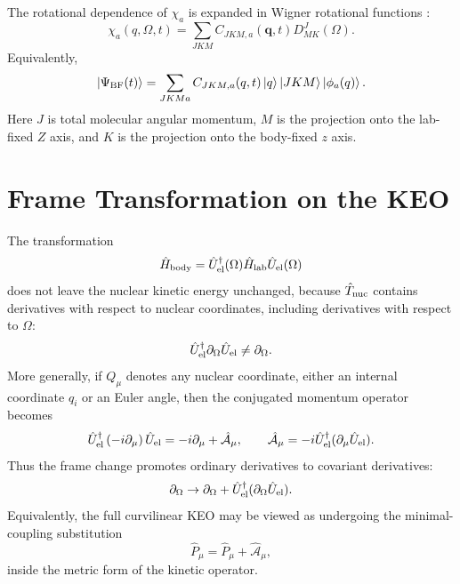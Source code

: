 \documentclass[11pt]{revtex4-2}
\begin{document}
The rotational dependence of $\chi_a$ is expanded in Wigner rotational
functions \cite{zare1988,varshalovich1988}:
\begin{equation}
	\chi_a(q,\Omega,t)
	=
	\sum_{J K M}
	C_{J K M,a}(\mathbf q,t)
	D^J_{M K}(\Omega).
\end{equation}
Equivalently,
\begin{equation}
	\ket{\Psi_{\rm BF}(t)}
	=
	\sum_{J K M a}
	C_{J K M,a}(q,t)
	\ket{q}
	\ket{J K M}
	\ket{\phi_a(q)} .
	\label{eq:body-expansion-continuous}
\end{equation}
Here $J$ is total molecular angular momentum, $M$ is the projection onto the
lab-fixed $Z$ axis, and $K$ is the projection onto the body-fixed $z$ axis.

\section{Frame Transformation on the KEO}

The transformation
\begin{equation}
  \hat{H}_{\rm body}
  =
  \hat{U}_{\rm el}^\dagger(\Omega)
  \hat{H}_{\rm lab}
  \hat{U}_{\rm el}(\Omega)
\end{equation}
does not leave the nuclear kinetic energy unchanged, because
$\hat{T}_{\rm nuc}$ contains derivatives with respect to nuclear coordinates,
including derivatives with respect to $\Omega$:
\begin{equation}
  \hat{U}_{\rm el}^\dagger
  \partial_\Omega
  \hat{U}_{\rm el}
  \neq
  \partial_\Omega .
\end{equation}
More generally, if $Q_\mu$ denotes any nuclear coordinate, either an
internal coordinate $q_i$ or an Euler angle, then the conjugated momentum
operator becomes
\begin{equation}
  \hat{U}_{\rm el}^\dagger
  \left(
    -i\partial_\mu
  \right)
  \hat{U}_{\rm el}
  =
  -i\partial_\mu
  +
  \hat{\mathcal A}_\mu,
  \qquad
  \hat{\mathcal A}_\mu
  =
  -i\hat{U}_{\rm el}^\dagger
  (\partial_\mu \hat{U}_{\rm el}) .
  \label{eq:covariant-momentum}
\end{equation}
Thus the frame change promotes ordinary derivatives to covariant
derivatives:
\begin{equation}
  \partial_\Omega
  \rightarrow
  \partial_\Omega
  +
  \hat{U}_{\rm el}^\dagger
  (\partial_\Omega \hat{U}_{\rm el}) .
\end{equation}
Equivalently, the full curvilinear KEO may be viewed as undergoing the
minimal-coupling substitution
\begin{equation}
  \hat{P}_\mu
  =
  \hat{P}_\mu + \hat{\mathcal A}_\mu,
\end{equation}
inside the metric form of the kinetic operator.
\end{document}
